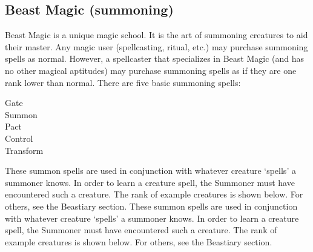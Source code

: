 \documentclass[twoside]{book}
\begin{document}
    

\subsection{Beast Magic (summoning)}
      Beast Magic is a unique magic school. It is the art
               of summoning creatures to aid their master. Any magic user
               (spellcasting, ritual, etc.) may purchase summoning spells
               as normal. However, a spellcaster that specializes in
               Beast Magic (and has no other magical aptitudes) may
               purchase summoning spells as if they are one rank lower
               than normal.   There are five basic summoning spells: 
\begin{description}
    
  \item[ Gate ] 
  \item[ Summon ] 
  \item[ Pact ] 
  \item[ Control ] 
  \item[ Transform ] 
\end{description}
    These summon spells are used in conjunction with
               whatever creature `spells' a summoner knows.
               In order to learn a creature spell, the Summoner must have
               encountered such a creature. The rank of example creatures
               is shown below. For others, see the Beastiary section.
                 These summon spells are used in conjunction with
               whatever creature `spells' a summoner knows.
               In order to learn a creature spell, the Summoner must have
               encountered such a creature. The rank of example creatures
               is shown below. For others, see the Beastiary section.
               
\end{document}

